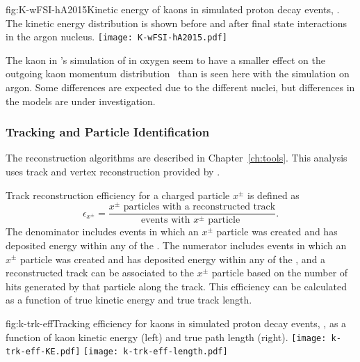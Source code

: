 \begin{dunefigure}{fig:K-wFSI-hA2015}{Kinetic energy of kaons in simulated proton decay events, \ptoknubar.  The kinetic energy distribution is shown before and after final state interactions in the argon nucleus.}
\texttt{[image: K-wFSI-hA2015.pdf]}
\end{dunefigure}

The kaon  in \superk's simulation of \ptoknubar in oxygen seem to have a smaller effect on the outgoing kaon momentum distribution~\cite{Abe:2014mwa} than is seen here with the  simulation on argon.  Some differences are expected due to the different nuclei, but differences in the  models are under investigation.

\subsubsection{Tracking and Particle Identification}
\label{sec:event-reconstruction}

The  reconstruction algorithms are described in Chapter~\ref{ch:tools}.  This analysis uses \threed track and vertex reconstruction provided by .

Track reconstruction efficiency for a charged particle $x^{\pm}$ is defined as 
\begin{equation}
\epsilon_{x^{\pm}} = \frac{\mbox{$x^{\pm}$ particles with a reconstructed track}}{\mbox{events with $x^{\pm}$ particle }}.
\end{equation}
The denominator includes events in which an $x^{\pm}$ particle was created and has deposited energy within any of the .  The numerator includes events in which an $x^{\pm}$ particle was created and has deposited energy within any of the , and a reconstructed track can be associated to the $x^{\pm}$ particle based on the number of hits generated by that particle along the track. This efficiency can be calculated as a function of true kinetic energy and true track length.

\begin{dunefigure}{fig:k-trk-eff}{Tracking efficiency for kaons in simulated proton decay events, \ptoknubar, as a function of kaon kinetic energy (left) and true path length (right).}
\texttt{[image: k-trk-eff-KE.pdf]}
\texttt{[image: k-trk-eff-length.pdf]}
\end{dunefigure}

